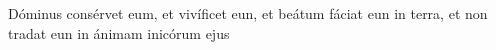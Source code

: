     {Dóminus consérvet eum, et vivíficet eun, et beátum fáciat eun in terra, et non tradat eun in ánimam inicórum ejus}